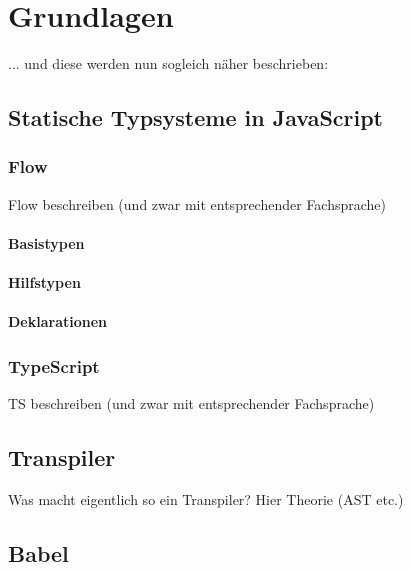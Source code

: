 \chapter{Grundlagen}

... und diese werden nun sogleich näher beschrieben:

\section{Statische Typsysteme in JavaScript}

  \subsection{Flow}
    Flow beschreiben (und zwar mit entsprechender Fachsprache)

    \subsubsection{Basistypen}
    \subsubsection{Hilfstypen}
    \subsubsection{Deklarationen}

  \subsection{TypeScript}
    TS beschreiben (und zwar mit entsprechender Fachsprache)

\section{Transpiler}

  Was macht eigentlich so ein Transpiler? Hier Theorie (AST etc.)

\section{Babel}
